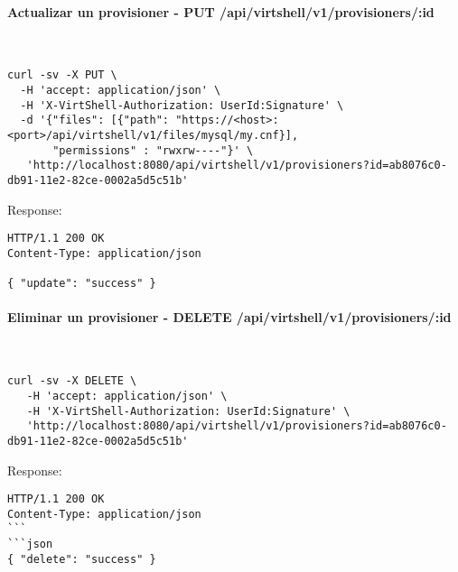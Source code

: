 \paragraph{Actualizar un provisioner - PUT /api/virtshell/v1/provisioners/:id} ~\\

\begin{lstlisting}[style=json]
curl -sv -X PUT \
  -H 'accept: application/json' \
  -H 'X-VirtShell-Authorization: UserId:Signature' \
  -d '{"files": [{"path": "https://<host>:<port>/api/virtshell/v1/files/mysql/my.cnf}],
       "permissions" : "rwxrw----"}' \
   'http://localhost:8080/api/virtshell/v1/provisioners?id=ab8076c0-db91-11e2-82ce-0002a5d5c51b'
\end{lstlisting}

Response:

\begin{lstlisting}[style=json]
HTTP/1.1 200 OK
Content-Type: application/json

{ "update": "success" }
\end{lstlisting}

\paragraph{Eliminar un provisioner - DELETE /api/virtshell/v1/provisioners/:id} ~\\

\begin{lstlisting}[style=json]
curl -sv -X DELETE \
   -H 'accept: application/json' \
   -H 'X-VirtShell-Authorization: UserId:Signature' \
   'http://localhost:8080/api/virtshell/v1/provisioners?id=ab8076c0-db91-11e2-82ce-0002a5d5c51b'
\end{lstlisting}

Response:

\begin{lstlisting}[style=json]
HTTP/1.1 200 OK
Content-Type: application/json
```
```json
{ "delete": "success" }
\end{lstlisting}
